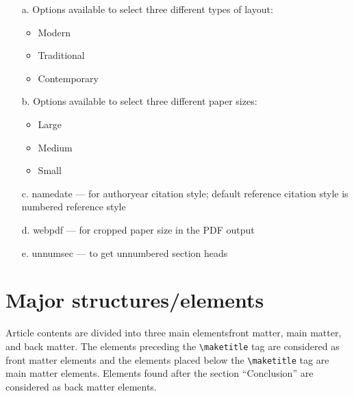 \documentclass{article}
\begin{document}
\begin{enumerate}
\item[a.] Options available to select three different types of layout:
\begin{itemize}
\item Modern
\item Traditional
\item Contemporary
\end{itemize}
\item[b.] Options available to select three different paper sizes:
\begin{itemize}
\item Large
\item Medium
\item Small
\end{itemize}
\item[c.] namedate --- for authoryear citation style; default reference citation style is numbered reference style
\item[d.] webpdf --- for cropped paper size in the PDF output
\item[e.] unnumsec --- to get unnumbered section heads
\end{enumerate}

\section{Major structures/elements}

Article contents are divided into three main elementsfront matter, main matter, and back matter. The elements preceding the \verb+\maketitle+ tag are considered as front matter elements and the elements placed below the \verb+\maketitle+ tag are main matter elements. Elements found after the section ``Conclusion'' are considered as back matter elements.
\end{document}
